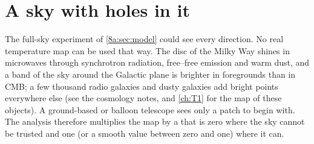 \providecommand{\EightBpipeChiSys}{}\renewcommand{\EightBpipeChiSys}{62}
\providecommand{\EightBpipePTESys}{}\renewcommand{\EightBpipePTESys}{0.003}
\providecommand{\EightBpipeChiSysLess}{}\renewcommand{\EightBpipeChiSysLess}{=}
\providecommand{\EightBpipeChiSimMean}{}\renewcommand{\EightBpipeChiSimMean}{26.8}
\providecommand{\EightBpipeChiSimStd}{}\renewcommand{\EightBpipeChiSimStd}{7.2}
\providecommand{\EightBpipeSysMaxPull}{}\renewcommand{\EightBpipeSysMaxPull}{3.4}
\providecommand{\EightBpipeSysNhigh}{}\renewcommand{\EightBpipeSysNhigh}{20}
\providecommand{\EightBpipeSysPhigh}{}\renewcommand{\EightBpipeSysPhigh}{0.031}
\providecommand{\EightBpipeSysPhighRel}{}\renewcommand{\EightBpipeSysPhighRel}{=}
\providecommand{\EightBpipeSysNsig}{}\renewcommand{\EightBpipeSysNsig}{4.3}
\providecommand{\EightBpipeNrep}{}\renewcommand{\EightBpipeNrep}{20}
\providecommand{\EightBpipeChiSysMed}{}\renewcommand{\EightBpipeChiSysMed}{63}
\providecommand{\EightBpipeChiSysMin}{}\renewcommand{\EightBpipeChiSysMin}{41}
\providecommand{\EightBpipeNsigSysMin}{}\renewcommand{\EightBpipeNsigSysMin}{1.5}
\providecommand{\EightBpipeA}{}\renewcommand{\EightBpipeA}{1.007}
\providecommand{\EightBpipesA}{}\renewcommand{\EightBpipesA}{0.005}
\providecommand{\EightBpipeAsimMean}{}\renewcommand{\EightBpipeAsimMean}{1.0006}
\providecommand{\EightBpipeAsimStd}{}\renewcommand{\EightBpipeAsimStd}{0.0046}
\providecommand{\EightBpipeCover}{}\renewcommand{\EightBpipeCover}{68}
\providecommand{\EightBpipeChiFit}{}\renewcommand{\EightBpipeChiFit}{18.0}
\providecommand{\EightBpipePTEFit}{}\renewcommand{\EightBpipePTEFit}{0.93}
\section{A sky with holes in it}
\label{8b:sec:masks}

The full-sky experiment of \cref{8a:sec:model} could see every direction. No real
temperature map can be used that way. The disc of the Milky Way shines in microwaves through
synchrotron radiation, free--free emission and warm dust, and a band of the sky around the
Galactic plane is brighter in foregrounds than in CMB; a few thousand radio galaxies and
dusty galaxies add bright points everywhere else (see the cosmology notes, and \cref{ch:T1} for
the map of these objects). A ground-based or balloon telescope sees only a patch to begin
with. The analysis therefore multiplies the map by a  that is zero where the sky
cannot be trusted and one (or a smooth value between zero and one) where it can.

